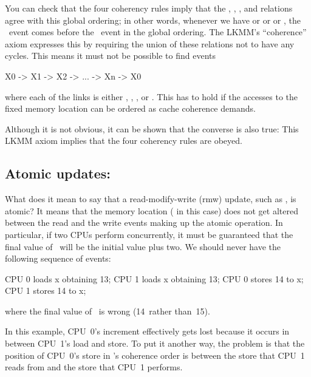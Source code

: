 You can check that the four coherency rules imply that the , , ,
and  relations agree with this global ordering; in other words,
whenever we have  or  or  or , the
~event comes before the ~event in the global ordering.
The LKMM's ``coherence'' axiom expresses this by requiring the union of these
relations not to have any cycles.
This means it must not be possible to find events

\begin{VerbatimU}
	X0 -> X1 -> X2 -> ... -> Xn -> X0
\end{VerbatimU}

\noindent%
where each of the links is either , , , or .
This has to hold if the accesses to the fixed memory location can be
ordered as cache coherence demands.

Although it is not obvious, it can be shown that the converse is also
true:
This LKMM axiom implies that the four coherency rules are obeyed.


\subsection{Atomic updates: }
\label{sec:docs:explanation:Atomic Updates: rmw}

What does it mean to say that a read-modify-write (rmw) update, such
as , is atomic?
It means that the memory location ( in this case) does not get
altered between the read and the write events making up the atomic
operation.
In particular, if two CPUs perform  concurrently,
it must be guaranteed that the final value of~ will be the
initial value plus two.
We should never have the following sequence of events:

\begin{VerbatimU}
	CPU 0 loads x obtaining 13;
	                                CPU 1 loads x obtaining 13;
	CPU 0 stores 14 to x;
	                                CPU 1 stores 14 to x;
\end{VerbatimU}

\noindent%
where the final value of~ is wrong (14~rather than~15).

In this example, CPU~0's increment effectively gets lost because it
occurs in between CPU~1's load and store.
To put it another way, the problem is that the position of CPU~0's
store in 's coherence order is between the store that CPU~1
reads from and the store that CPU~1 performs.

